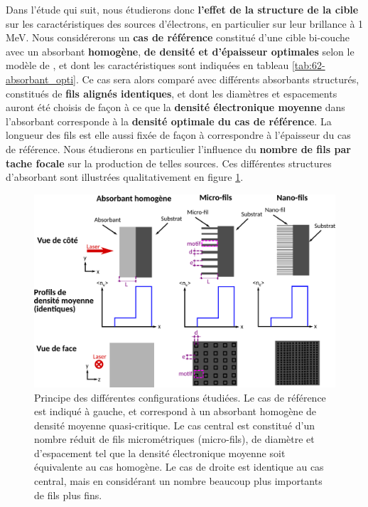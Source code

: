 \begin{refsection}
Dans l'étude qui suit, nous étudierons donc \textbf{l'effet de la structure de la cible} sur les caractéristiques des sources d'électrons, en particulier sur leur brillance à 1 MeV. Nous considérerons un \textbf{cas de référence} constitué d'une cible bi-couche avec un absorbant \textbf{homogène}, \textbf{de densité et d'épaisseur optimales} selon le modèle de \cite{pazzaglia_2020}, et dont les caractéristiques sont indiquées en tableau \ref{tab:62-absorbant_opti}. Ce cas sera alors comparé avec différents absorbants structurés, constitués de \textbf{fils alignés identiques}, et dont les diamètres et espacements auront été choisis de façon à ce que la \textbf{densité électronique moyenne} dans l'absorbant corresponde à la \textbf{densité optimale du cas de référence}. La longueur des fils est elle aussi fixée de façon à correspondre à l'épaisseur du cas de référence. Nous étudierons en particulier l'influence du \textbf{nombre de fils par tache focale} sur la production de telles sources. Ces différentes structures d'absorbant sont illustrées qualitativement en figure \ref{fig:62-principe_fils}.

\begin{figure}[hbtp]
	\centering
	\includegraphics[width=\linewidth]{6-opti_numerique/simu_fils.png}
    \caption{Principe des différentes configurations étudiées. Le cas de référence est indiqué à gauche, et correspond à un absorbant homogène de densité moyenne quasi-critique. Le cas central est constitué d'un nombre réduit de fils micrométriques (micro-fils), de diamètre et d'espacement tel que la densité électronique moyenne soit équivalente au cas homogène. Le cas de droite est identique au cas central, mais en considérant un nombre beaucoup plus importants de fils plus fins.}
	\label{fig:62-principe_fils}
\end{figure}


\end{refsection}
